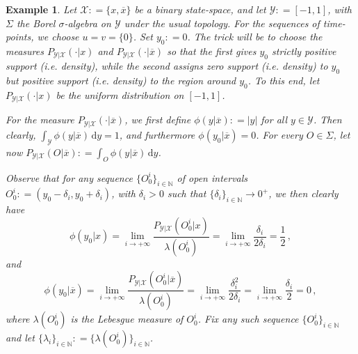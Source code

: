 \documentclass[3p]{elsarticle}
\newtheorem{example}{Example}[section]
\newcommand{\nats}{\mathbb{N}}
\newcommand{\states}{\mathcal{X}}
\newcommand{\observs}{\mathcal{Y}}
\newcommand{\abs}[1]{\left\vert #1 \right\vert}
\newcommand{\coloneqq}{:\!=}
\begin{document}
\begin{example}\label{ex:counter_example_regular}
Let $\states\coloneqq\{x,\overline{x}\}$ be a binary state-space, and let $\observs\coloneqq [-1,1]$, with $\Sigma$ the Borel $\sigma$-algebra on $\observs$ under the usual topology. For the sequences of time-points, we choose $u=v=\{0\}$. Set $y_0\coloneqq 0$. The trick will be to choose the measures $P_{\observs\vert\states}(\cdot\vert x)$ and $P_{\observs\vert\states}(\cdot\vert \overline{x})$ so that the first gives $y_0$ strictly positive support (i.e. density), while the second assigns zero support (i.e. density) to $y_0$ but positive support (i.e. density) to the region around $y_0$. To this end, let $P_{\observs\vert\states}(\cdot\vert x)$ be the uniform distribution on $[-1,1]$.

For the measure $P_{\observs\vert\states}(\cdot\vert \overline{x})$, we first define $\phi(y\vert\overline{x})\coloneqq\abs{y}$ for all $y\in\observs$. %
Then clearly, $\int_\observs \phi(y\vert\overline{x})\,\mathrm{d}y = 1$, and furthermore $\phi(y_0\vert\overline{x})=0$. For every $O\in\Sigma$, let now $P_{\observs\vert\states}(O\vert\overline{x})\coloneqq \int_O\phi(y\vert \overline{x})\,\mathrm{d}y$.%

Observe that for any sequence $\{O_0^i\}_{i\in\nats}$ of open intervals $O_0^i\coloneqq (y_0-\delta_i,y_0+\delta_i)$, with $\delta_i>0$ such that $\{\delta_i\}_{i\in\nats}\to0^+$, we then clearly have
\begin{equation*}
\phi(y_0\vert x) = \lim_{i\to+\infty} \frac{P_{\observs\vert\states}(O_0^i\vert x)}{\lambda(O_0^i)} = \lim_{i\to+\infty} \frac{\delta_i}{2\delta_i} = \frac{1}{2}\,,
\end{equation*}
and
\begin{equation*}
\phi(y_0\vert \overline{x}) = \lim_{i\to+\infty} \frac{P_{\observs\vert\states}(O_0^i\vert \overline{x})}{\lambda(O_0^i)} = \lim_{i\to+\infty} \frac{\delta_i^2}{2\delta_i} = \lim_{i\to+\infty} \frac{\delta_i}{2} = 0\,,
\end{equation*}
where $\lambda(O_0^i)$ is the Lebesgue measure of $O_0^i$. Fix any such sequence $\{O_0^i\}_{i\in\nats}$ and let $\{\lambda_i\}_{i\in\nats}\coloneqq\{\lambda(O_0^i)\}_{i\in\nats}$.


\end{example}
\end{document}
